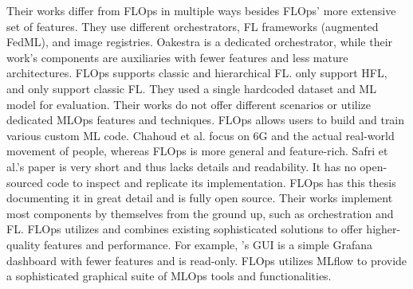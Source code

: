Their works differ from FLOps in multiple ways besides FLOps' more extensive set of features.
They use different orchestrators, FL frameworks (augmented FedML), and image registries.
Oakestra is a dedicated orchestrator, while their work's components are auxiliaries with fewer features and less mature architectures.
FLOps supports classic and hierarchical FL.
\cite{paper:fl_toward_on_demand_client_deployment_at_edge} only support HFL, and \cite{paper:global_fl_platform_for_iot} only support classic FL.
They used a single hardcoded dataset and ML model for evaluation.
Their works do not offer different scenarios or utilize dedicated MLOps features and techniques.
FLOps allows users to build and train various custom ML code.
Chahoud et al. focus on 6G and the actual real-world movement of people, whereas FLOps is more general and feature-rich.
Safri et al.'s paper is very short and thus lacks details and readability.
It has no open-sourced code to inspect and replicate its implementation.
FLOps has this thesis documenting it in great detail and is fully open source.
Their works implement most components by themselves from the ground up, such as orchestration and FL.
FLOps utilizes and combines existing sophisticated solutions to offer higher-quality features and performance.
For example, \cite{paper:global_fl_platform_for_iot}'s GUI is a simple Grafana dashboard with fewer features and is read-only.
FLOps utilizes MLflow to provide a sophisticated graphical suite of MLOps tools and functionalities.
